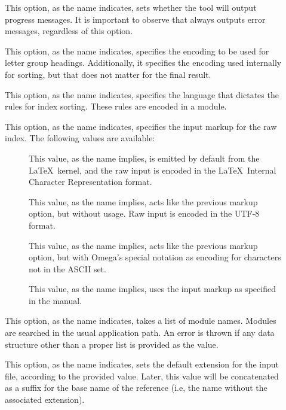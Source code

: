 \begin{description}
\begin{description}
\item[] This option, as the name indicates, sets whether the tool will output progress messages. It is important to observe that  always outputs error messages, regardless of this option.

\item[] This option, as the name indicates, specifies the encoding to be used for letter group headings. Additionally, it specifies the encoding used internally for sorting, but that does not matter for the final result.

\item[] This option, as the name indicates, specifies the language that dictates the rules for index sorting. These rules are encoded in a module.

\item[] This option, as the name indicates, specifies the input markup for the raw index. The following values are available:

\begin{description}
\item[] This value, as the name implies, is emitted by default from the \LaTeX\ kernel, and the raw input is encoded in the \LaTeX\ Internal Character Representation format.

\item[] This value, as the name implies, acts like the previous  markup option, but without  usage. Raw input is encoded in the UTF-8 format.

\item[] This value, as the name implies, acts like the previous  markup option, but with Omega's special notation as encoding for characters not in the ASCII set.

\item[] This value, as the name implies, uses the  input markup as specified in the  manual.
\end{description}

\item[] This option, as the name indicates, takes a list of module names. Modules are searched in the usual application path. An error is thrown if any data structure other than a proper list is provided as the value.

\item[] This option, as the name indicates, sets the default extension for the input file, according to the provided value. Later, this value will be concatenated as a suffix for the base name of the  reference (i.e, the name without the associated extension).


\end{description}
\end{description}
